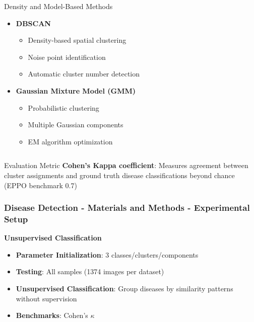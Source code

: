 \documentclass[aspectratio=43]{beamer}
\begin{document}
\begin{frame}
\begin{columns}
        \begin{column}{0.5\textwidth}
            \begin{block}{Density and Model-Based Methods}
                \begin{itemize}
                    \item \textbf{DBSCAN}
                        \begin{itemize}
                            \tiny
                            \item Density-based spatial clustering
                            \item Noise point identification
                            \item Automatic cluster number detection
                        \end{itemize}
                    \item \textbf{Gaussian Mixture Model (GMM)}
                        \begin{itemize}
                            \tiny
                            \item Probabilistic clustering
                            \item Multiple Gaussian components
                            \item EM algorithm optimization
                        \end{itemize}
                \end{itemize}
            \end{block}
        \end{column}
    \end{columns}
            
    \begin{alertblock}{Evaluation Metric}
        \scriptsize
        \textbf{Cohen's Kappa coefficient}: Measures agreement between cluster assignments and ground truth disease classifications beyond chance (EPPO benchmark 0.7)
    \end{alertblock}
\end{frame}

\begin{frame}
    \frametitle{\small Disease Detection - Materials and Methods - Experimental Setup}
    \textbf{Unsupervised Classification}
        \begin{itemize}
            \item \textbf{Parameter Initialization}: 3 classes/clusters/components
            \item \textbf{Testing}: All samples (1374 images per dataset)
            \item \textbf{Unsupervised Classification}: Group diseases by similarity patterns without supervision
            \item \textbf{Benchmarks}: Cohen's $\kappa$
        \end{itemize}
\end{frame}
\end{document}
